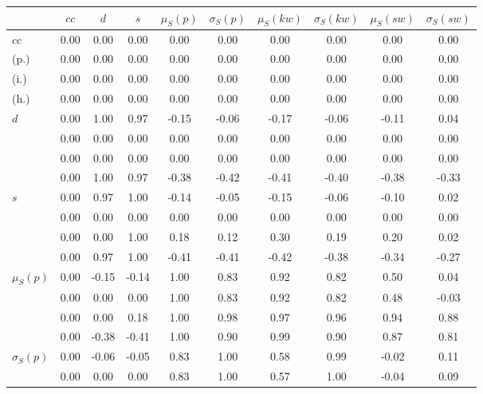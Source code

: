 \begin{table*}[h!]
\begin{center}
\begin{tabular}{| l | c | c | c | c | c | c | c | c | c |}\hline
 & $cc$ & $d$ & $s$ & $\mu_S(p)$ & $\sigma_S(p)$ & $\mu_S(kw)$ & $\sigma_S(kw)$ & $\mu_S(sw)$ & $\sigma_S(sw)$ \\\hline
$cc$ & 0.00  & 0.00  & 0.00  & 0.00  & 0.00  & 0.00  & 0.00  & 0.00  & 0.00 \\\hline
(p.) & 0.00  & 0.00  & 0.00  & 0.00  & 0.00  & 0.00  & 0.00  & 0.00  & 0.00 \\\hline
(i.) & 0.00  & 0.00  & 0.00  & 0.00  & 0.00  & 0.00  & 0.00  & 0.00  & 0.00 \\\hline
(h.) & 0.00  & 0.00  & 0.00  & 0.00  & 0.00  & 0.00  & 0.00  & 0.00  & 0.00 \\\hline
$d$ & 0.00  & 1.00  & 0.97  & -0.15  & -0.06  & -0.17  & -0.06  & -0.11  & 0.04 \\\hline
 & 0.00  & 0.00  & 0.00  & 0.00  & 0.00  & 0.00  & 0.00  & 0.00  & 0.00 \\\hline
 & 0.00  & 0.00  & 0.00  & 0.00  & 0.00  & 0.00  & 0.00  & 0.00  & 0.00 \\\hline
 & 0.00  & 1.00  & 0.97  & -0.38  & -0.42  & -0.41  & -0.40  & -0.38  & -0.33 \\\hline
$s$ & 0.00  & 0.97  & 1.00  & -0.14  & -0.05  & -0.15  & -0.06  & -0.10  & 0.02 \\\hline
 & 0.00  & 0.00  & 0.00  & 0.00  & 0.00  & 0.00  & 0.00  & 0.00  & 0.00 \\\hline
 & 0.00  & 0.00  & 1.00  & 0.18  & 0.12  & 0.30  & 0.19  & 0.20  & 0.02 \\\hline
 & 0.00  & 0.97  & 1.00  & -0.41  & -0.41  & -0.42  & -0.38  & -0.34  & -0.27 \\\hline
$\mu_S(p)$ & 0.00  & -0.15  & -0.14  & 1.00  & 0.83  & 0.92  & 0.82  & 0.50  & 0.04 \\\hline
 & 0.00  & 0.00  & 0.00  & 1.00  & 0.83  & 0.92  & 0.82  & 0.48  & -0.03 \\\hline
 & 0.00  & 0.00  & 0.18  & 1.00  & 0.98  & 0.97  & 0.96  & 0.94  & 0.88 \\\hline
 & 0.00  & -0.38  & -0.41  & 1.00  & 0.90  & 0.99  & 0.90  & 0.87  & 0.81 \\\hline
$\sigma_S(p)$ & 0.00  & -0.06  & -0.05  & 0.83  & 1.00  & 0.58  & 0.99  & -0.02  & 0.11 \\\hline
 & 0.00  & 0.00  & 0.00  & 0.83  & 1.00  & 0.57  & 1.00  & -0.04  & 0.09 \\\hline

\end{tabular}
\end{center}
\end{table*}
